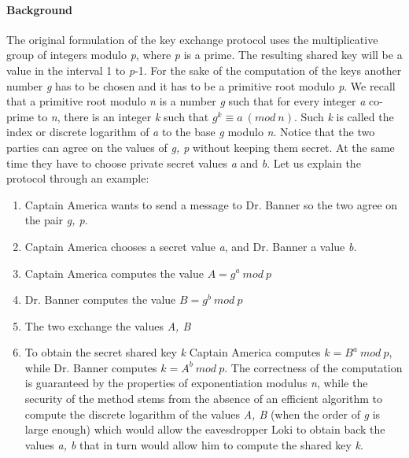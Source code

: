 \documentclass[11pt]{article}
\begin{document}
\paragraph*{Background}
The original formulation of the key exchange protocol uses the multiplicative group of integers modulo \textit{p}, where \textit{p} is a prime. The resulting shared key will be a value in the interval 1 to \textit{p}-1. For the sake of the computation of the keys another number \textit{g} has to be chosen and it has to be a primitive root modulo \textit{p}. We recall that a primitive root modulo \textit{n} is a number \textit{g} such that for every integer \textit{a} co-prime to \textit{n}, there is an integer \textit{k} such that $g^k \equiv a\ (mod\ n)$. Such \textit{k} is called the index or discrete logarithm of \textit{a} to the base \textit{g} modulo \textit{n}.
Notice that the two parties can agree on the values of \textit{g, p} without keeping them secret. At the same time they have to choose private secret values \textit{a} and \textit{b}. Let us explain the protocol through an example:
\begin{enumerate}
\item Captain America wants to send a message to Dr. Banner so the two agree on the pair \textit{g, p}.
\item Captain America chooses a secret value \textit{a}, and Dr. Banner a value \textit{b}.
\item Captain America computes the value $A = g^a\ mod\ p$
\item Dr. Banner computes the value $B = g^b\ mod\ p$
\item The two exchange the values \textit{A, B}
\item To obtain the secret shared key \textit{k} Captain America computes $k = B^a\ mod\ p$, while Dr. Banner computes $k = A^b\ mod\ p$. The correctness of the computation is guaranteed by the properties of exponentiation modulus \textit{n}, while the security of the method stems from the absence of an efficient algorithm to compute the discrete logarithm of the values \textit{A, B} (when the order of \textit{g} is large enough) which would allow the eavesdropper Loki to obtain back the values \textit{a, b} that in turn would allow him to compute the shared key \textit{k}.
\end{enumerate}
\end{document}

